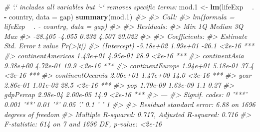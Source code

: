 \documentclass[
]{book}
\newenvironment{Shaded}{\begin{snugshade}}{\end{snugshade}}
\newcommand{\CommentTok}[1]{\textcolor[rgb]{0.56,0.35,0.01}{\textit{#1}}}
\newcommand{\DataTypeTok}[1]{\textcolor[rgb]{0.13,0.29,0.53}{#1}}
\newcommand{\FloatTok}[1]{\textcolor[rgb]{0.00,0.00,0.81}{#1}}
\newcommand{\KeywordTok}[1]{\textcolor[rgb]{0.13,0.29,0.53}{\textbf{#1}}}
\newcommand{\NormalTok}[1]{#1}
\newcommand{\OperatorTok}[1]{\textcolor[rgb]{0.81,0.36,0.00}{\textbf{#1}}}
\newcommand{\StringTok}[1]{\textcolor[rgb]{0.31,0.60,0.02}{#1}}
\begin{document}
\begin{Shaded}
\begin{Highlighting}[]
\CommentTok{# `.` includes all  variables but `-` removes specific terms:}
\NormalTok{mod}\FloatTok{.1}\NormalTok{ <-}\StringTok{ }\KeywordTok{lm}\NormalTok{(lifeExp }\OperatorTok{~}\StringTok{ }\NormalTok{. }\OperatorTok{-}\StringTok{ }\NormalTok{country,}
            \DataTypeTok{data =}\NormalTok{ gap)}
\KeywordTok{summary}\NormalTok{(mod}\FloatTok{.1}\NormalTok{)}
\CommentTok{#> }
\CommentTok{#> Call:}
\CommentTok{#> lm(formula = lifeExp ~ . - country, data = gap)}
\CommentTok{#> }
\CommentTok{#> Residuals:}
\CommentTok{#>     Min      1Q  Median      3Q     Max }
\CommentTok{#> -28.405  -4.055   0.232   4.507  20.022 }
\CommentTok{#> }
\CommentTok{#> Coefficients:}
\CommentTok{#>                    Estimate Std. Error t value Pr(>|t|)    }
\CommentTok{#> (Intercept)       -5.18e+02   1.99e+01   -26.1   <2e-16 ***}
\CommentTok{#> continentAmericas  1.43e+01   4.95e-01    28.9   <2e-16 ***}
\CommentTok{#> continentAsia      9.38e+00   4.72e-01    19.9   <2e-16 ***}
\CommentTok{#> continentEurope    1.94e+01   5.18e-01    37.4   <2e-16 ***}
\CommentTok{#> continentOceania   2.06e+01   1.47e+00    14.0   <2e-16 ***}
\CommentTok{#> year               2.86e-01   1.01e-02    28.5   <2e-16 ***}
\CommentTok{#> pop                1.79e-09   1.63e-09     1.1     0.27    }
\CommentTok{#> gdpPercap          2.98e-04   2.00e-05    14.9   <2e-16 ***}
\CommentTok{#> ---}
\CommentTok{#> Signif. codes:  0 '***' 0.001 '**' 0.01 '*' 0.05 '.' 0.1 ' ' 1}
\CommentTok{#> }
\CommentTok{#> Residual standard error: 6.88 on 1696 degrees of freedom}
\CommentTok{#> Multiple R-squared:  0.717,  Adjusted R-squared:  0.716 }
\CommentTok{#> F-statistic:  614 on 7 and 1696 DF,  p-value: <2e-16}


\end{Highlighting}
\end{Shaded}
\end{document}
